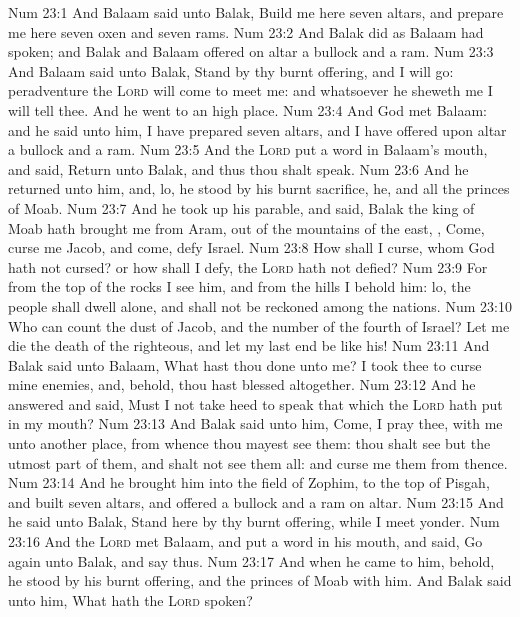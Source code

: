 \vs Num 23:1 And Balaam said unto Balak, Build me here seven altars, and prepare me here seven oxen and seven rams.
\vs Num 23:2 And Balak did as Balaam had spoken; and Balak and Balaam offered on  altar a bullock and a ram.
\vs Num 23:3 And Balaam said unto Balak, Stand by thy burnt offering, and I will go: peradventure the \textsc{Lord} will come to meet me: and whatsoever he sheweth me I will tell thee. And he went to an high place.
\vs Num 23:4 And God met Balaam: and he said unto him, I have prepared seven altars, and I have offered upon  altar a bullock and a ram.
\vs Num 23:5 And the \textsc{Lord} put a word in Balaam's mouth, and said, Return unto Balak, and thus thou shalt speak.
\vs Num 23:6 And he returned unto him, and, lo, he stood by his burnt sacrifice, he, and all the princes of Moab.
\vs Num 23:7 And he took up his parable, and said, Balak the king of Moab hath brought me from Aram, out of the mountains of the east, , Come, curse me Jacob, and come, defy Israel.
\vs Num 23:8 How shall I curse, whom God hath not cursed? or how shall I defy,  the \textsc{Lord} hath not defied?
\vs Num 23:9 For from the top of the rocks I see him, and from the hills I behold him: lo, the people shall dwell alone, and shall not be reckoned among the nations.
\vs Num 23:10 Who can count the dust of Jacob, and the number of the fourth  of Israel? Let me die the death of the righteous, and let my last end be like his!
\vs Num 23:11 And Balak said unto Balaam, What hast thou done unto me? I took thee to curse mine enemies, and, behold, thou hast blessed  altogether.
\vs Num 23:12 And he answered and said, Must I not take heed to speak that which the \textsc{Lord} hath put in my mouth?
\vs Num 23:13 And Balak said unto him, Come, I pray thee, with me unto another place, from whence thou mayest see them: thou shalt see but the utmost part of them, and shalt not see them all: and curse me them from thence.
\vs Num 23:14 And he brought him into the field of Zophim, to the top of Pisgah, and built seven altars, and offered a bullock and a ram on  altar.
\vs Num 23:15 And he said unto Balak, Stand here by thy burnt offering, while I meet  yonder.
\vs Num 23:16 And the \textsc{Lord} met Balaam, and put a word in his mouth, and said, Go again unto Balak, and say thus.
\vs Num 23:17 And when he came to him, behold, he stood by his burnt offering, and the princes of Moab with him. And Balak said unto him, What hath the \textsc{Lord} spoken?
